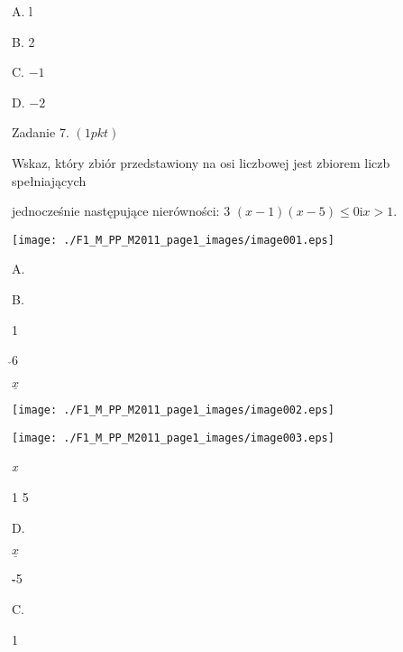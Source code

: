 \documentclass[a4paper,12pt]{article}
\begin{document}
A. l

B. 2

C. $-1$

D. $-2$

Zadanie 7. $(1pkt)$

Wskaz, który zbiór przedstawiony na osi liczbowej jest zbiorem liczb spełniających

jednocześnie następujące nierówności: 3 $(x-1)(x-5)\leq 0 \mathrm{i} x>1.$
\begin{center}
\texttt{[image: ./F1\_M\_PP\_M2011\_page1\_images/image001.eps]}
\end{center}
A.

B.

1

$\check{}$6

$\underline{x}$
\begin{center}
\texttt{[image: ./F1\_M\_PP\_M2011\_page1\_images/image002.eps]}

\texttt{[image: ./F1\_M\_PP\_M2011\_page1\_images/image003.eps]}
\end{center}
{\it x}

1 5

D.

$\underline{x}$

-$\check{}$5

C.

1
\end{document}
